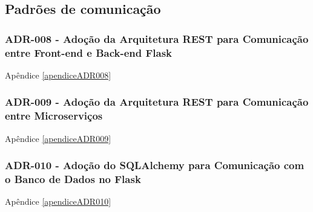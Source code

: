 \subsection{Padrões de comunicação}

\subsubsection*{ADR-008 - Adoção da Arquitetura REST para Comunicação entre Front-end e Back-end Flask}

Apêndice \ref{apendiceADR008}

\subsubsection*{ADR-009 - Adoção da Arquitetura REST para Comunicação entre Microserviços}

Apêndice \ref{apendiceADR009}

\subsubsection*{ADR-010 - Adoção do SQLAlchemy para Comunicação com o Banco de Dados no Flask}  

Apêndice \ref{apendiceADR010}